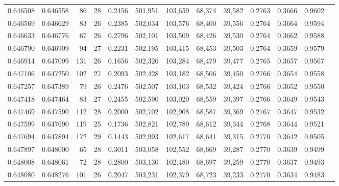 \begin{tabular}{rrrrrrrrrrrrr}
0.646508 & 0.646558 &    86 &  28 &                                     0.2456 & 501,951 & 103,659 &  68,374 &  39,582 & 0.2763 & 0.3666 & 0.9602 \\
0.646569 & 0.646629 &    83 &  26 &                                     0.2385 & 502,034 & 103,576 &  68,400 &  39,556 & 0.2764 & 0.3664 & 0.9594 \\
0.646633 & 0.646776 &    67 &  26 &                                     0.2796 & 502,101 & 103,509 &  68,426 &  39,530 & 0.2764 & 0.3662 & 0.9588 \\
0.646790 & 0.646909 &    94 &  27 &                                     0.2231 & 502,195 & 103,415 &  68,453 &  39,503 & 0.2764 & 0.3659 & 0.9579 \\
0.646914 & 0.647099 &   131 &  26 &                                     0.1656 & 502,326 & 103,284 &  68,479 &  39,477 & 0.2765 & 0.3657 & 0.9567 \\
0.647106 & 0.647250 &   102 &  27 &                                     0.2093 & 502,428 & 103,182 &  68,506 &  39,450 & 0.2766 & 0.3654 & 0.9558 \\
0.647257 & 0.647389 &    79 &  26 &                                     0.2476 & 502,507 & 103,103 &  68,532 &  39,424 & 0.2766 & 0.3652 & 0.9550 \\
0.647418 & 0.647464 &    83 &  27 &                                     0.2455 & 502,590 & 103,020 &  68,559 &  39,397 & 0.2766 & 0.3649 & 0.9543 \\
0.647469 & 0.647590 &   112 &  28 &                                     0.2000 & 502,702 & 102,908 &  68,587 &  39,369 & 0.2767 & 0.3647 & 0.9532 \\
0.647599 & 0.647690 &   119 &  25 &                                     0.1736 & 502,821 & 102,789 &  68,612 &  39,344 & 0.2768 & 0.3644 & 0.9521 \\
0.647694 & 0.647894 &   172 &  29 &                                     0.1443 & 502,993 & 102,617 &  68,641 &  39,315 & 0.2770 & 0.3642 & 0.9505 \\
0.647897 & 0.648000 &    65 &  28 &                                     0.3011 & 503,058 & 102,552 &  68,669 &  39,287 & 0.2770 & 0.3639 & 0.9499 \\
0.648008 & 0.648061 &    72 &  28 &                                     0.2800 & 503,130 & 102,480 &  68,697 &  39,259 & 0.2770 & 0.3637 & 0.9493 \\
0.648080 & 0.648276 &   101 &  26 &                                     0.2047 & 503,231 & 102,379 &  68,723 &  39,233 & 0.2770 & 0.3634 & 0.9483 \\

\end{tabular}
